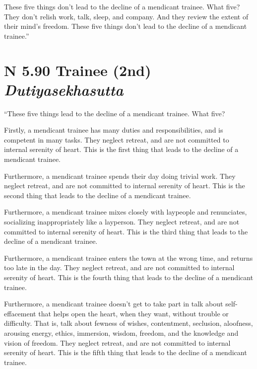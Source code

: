 \documentclass[12pt,openany]{book}%
\newcommand*{\suttatitleacronym}[1]{\smaller[2]{#1}\vspace*{.3em}}
\newcommand*{\suttatitletranslation}[1]{\linebreak{#1}}
\newcommand*{\suttatitleroot}[1]{\linebreak\smaller[2]\itshape{#1}}
\newcommand*{\tocacronym}[1]{\hspace*{-3.3em}{#1}\quad}
\newcommand*{\toctranslation}[1]{#1}
\newcommand*{\tocroot}[1]{(\textit{#1})}
\begin{document}
These five things don’t lead to the decline of a mendicant trainee. What five? They don’t relish work, talk, sleep, and company. And they review the extent of their mind’s freedom. These five things don’t lead to the decline of a mendicant trainee.” 

%
\section*{{\suttatitleacronym AN 5.90}{\suttatitletranslation A Trainee (2nd) }{\suttatitleroot Dutiyasekhasutta}}
\addcontentsline{toc}{section}{\tocacronym{AN 5.90} \toctranslation{A Trainee (2nd) } \tocroot{Dutiyasekhasutta}}

“These five things lead to the decline of a mendicant trainee. What five? 

Firstly, a mendicant trainee has many duties and responsibilities, and is competent in many tasks. They neglect retreat, and are not committed to internal serenity of heart. This is the first thing that leads to the decline of a mendicant trainee. 

Furthermore, a mendicant trainee spends their day doing trivial work. They neglect retreat, and are not committed to internal serenity of heart. This is the second thing that leads to the decline of a mendicant trainee. 

Furthermore, a mendicant trainee mixes closely with laypeople and renunciates, socializing inappropriately like a layperson. They neglect retreat, and are not committed to internal serenity of heart. This is the third thing that leads to the decline of a mendicant trainee. 

Furthermore, a mendicant trainee enters the town at the wrong time, and returns too late in the day. They neglect retreat, and are not committed to internal serenity of heart. This is the fourth thing that leads to the decline of a mendicant trainee. 

Furthermore, a mendicant trainee doesn’t get to take part in talk about self-effacement that helps open the heart, when they want, without trouble or difficulty. That is, talk about fewness of wishes, contentment, seclusion, aloofness, arousing energy, ethics, immersion, wisdom, freedom, and the knowledge and vision of freedom. They neglect retreat, and are not committed to internal serenity of heart. This is the fifth thing that leads to the decline of a mendicant trainee. 
\end{document}
